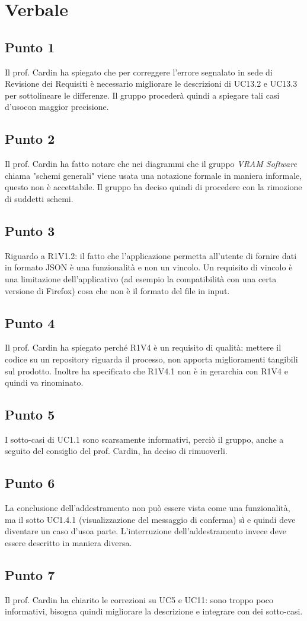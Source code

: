 \section{Verbale}
	\subsection{Punto 1}
	Il prof. Cardin ha spiegato che per correggere l'errore segnalato in sede di Revisione dei Requisiti è necessario migliorare le descrizioni di UC13.2 e UC13.3 per sottolineare le differenze. Il gruppo procederà quindi a spiegare tali casi d'uso\glosp con maggior precisione.
	
    \subsection{Punto 2}
    Il prof. Cardin ha fatto notare che nei diagrammi che il gruppo \textit{VRAM Software} chiama "schemi generali" viene usata una notazione formale in maniera informale, questo non è accettabile. Il gruppo ha deciso quindi di procedere con la rimozione di suddetti schemi.
    
    \subsection{Punto 3}
    Riguardo a R1V1.2: il fatto che l'applicazione permetta all'utente di fornire dati in formato JSON è una funzionalità e non un vincolo. Un requisito di vincolo è una limitazione dell'applicativo (ad esempio la compatibilità con una certa versione di Firefox) cosa che non è il formato del file in input.
    
    \subsection{Punto 4}
    Il prof. Cardin ha spiegato perché R1V4 è un requisito di qualità: mettere il codice su un repository riguarda il processo, non apporta miglioramenti tangibili sul prodotto. Inoltre ha specificato che R1V4.1 non è in gerarchia con R1V4 e quindi va rinominato.
    
    \subsection{Punto 5}
    I sotto-casi di UC1.1 sono scarsamente informativi, perciò il gruppo, anche a seguito del consiglio del prof. Cardin, ha deciso di rimuoverli.
    
    \subsection{Punto 6}
    La conclusione dell'addestramento non può essere vista come una funzionalità, ma il sotto UC1.4.1 (visualizzazione del messaggio di conferma) sì e quindi deve diventare un caso d'uso\glosp a parte. L'interruzione dell'addestramento invece deve essere descritto in maniera diversa.
    
    \subsection{Punto 7}
    Il prof. Cardin ha chiarito le correzioni su UC5 e UC11: sono troppo poco informativi, bisogna quindi migliorare la descrizione e integrare con dei sotto-casi.
    
    
    
    
  
       